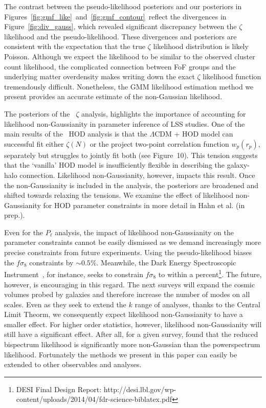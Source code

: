 \documentclass[12pt, letterpaper, preprint]{aastex}
\newcommand{\Sinh}{\citetalias{sinha2017}}
\begin{document}
The contrast between the pseudo-likelihood posteriors and our posteriors
in Figures~\ref{fig:gmf_like}~and~\ref{fig:gmf_contour}~reflect 
the divergences in Figure~\ref{fig:div_gauss}, which revealed significant
discrepancy between the $\zeta$ likelihood and the pseudo-likelihood. 
These divergences and posteriors are consistent with the expectation 
that the true $\zeta$ likelihood distribution is likely Poisson. Although 
we expect the likelihood to be similar to the observed cluster count likelihood, 
the complicated connection between FoF groups and the underlying 
matter overdensity makes writing down the exact $\zeta$ likelihood function 
tremendously difficult. Nonetheless, the GMM likelihood estimation method we 
present provides an accurate estimate of the non-Gaussian likelihood. 

The posteriors of the \Sinh~$\zeta$ analysis, highlights the importance of 
accounting for likelihood non-Gaussianity in parameter inference of 
LSS studies. One of the main results of the \Sinh~HOD analysis 
is that the $\Lambda$CDM + HOD model can successful 
fit either $\zeta(N)$ or the project two-point correlation function 
$w_p(r_p)$, separately but struggles to jointly fit both (see Figure~10). 
This tension suggests that the `vanilla' HOD model is insufficiently 
flexible in describing the galaxy-halo connection. Likelihood non-Gaussianity,
however, impacts this result. Once the non-Gaussianity is included in 
the analysis, the posteriors are broadened and shifted towards 
relaxing the tensions. We examine the effect of likelihood non-Gaussianity 
for HOD parameter constraints in more detail in Hahn et al. (in prep.). 

Even for the $P_\ell$ analysis, the impact of likelihood non-Gaussianity 
on the parameter constraints cannot be easily dismissed as we demand 
increasingly more precise constraints from future experiments. Using the 
pseudo-likelihood biases the $f\sigma_8$ constraints by $\sim 0.5\%$. 
Meanwhile, the Dark Energy Spectroscopic Instrument~\citep[DESI;][]{levi2013}, 
for instance, seeks to constrain $f\sigma_8$ to within a 
percent\footnote{DESI Final Design Report: http://desi.lbl.gov/wp-content/uploads/2014/04/fdr-science-biblatex.pdf}. 
The future, however, is encouraging in this regard.  The next surveys 
will expand the cosmic volumes probed by galaxies and therefore increase 
the number of modes on all scales. Even as they seek to extend the $k$ 
range of analyses, thanks to the Central Limit Theorm, we consequently expect 
likelihood non-Gaussianity to have a smaller effect. For higher order statistics, 
however, likelihood non-Gaussianity will still have a significant effect. After 
all, for a given survey, \cite{scoccimarro2000} found that the reduced 
bispectrum likelihood is significantly more non-Gaussian than the powerspectrum 
likelihood.  
Fortunately the methods we present in this paper can easily be extended to other 
observables and analyses. 
\end{document}
